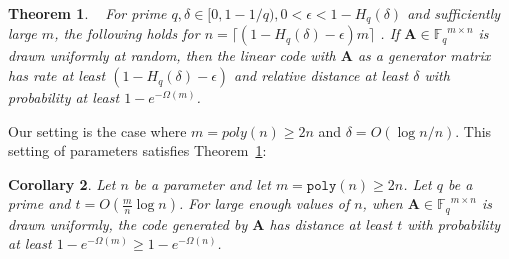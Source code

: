 \documentclass[11pt]{article}
\newcommand{\thref}[1]{\mbox{Theorem~\ref{#1}}}
\newcommand{\vect}[1]{\ensuremath{\textbf{#1}}}
\newcommand{\Fq}{\ensuremath{\mathbb{F}_q}}
\newcommand{\poly}{\ensuremath{\mathtt{poly}}\xspace}
\newtheorem{theorem}{Theorem}[section]
\newtheorem{corollary}[theorem]{Corollary}
\newcommand{\vA}{\vect{A}}
\begin{document}
\begin{theorem}~\cite[Theorem 8]{venkatLecture}
\label{thm:random code good distance}
For prime $q, \delta\in [0, 1-1/q), 0<\epsilon< 1-H_q(\delta)$ and sufficiently large $m$, the following holds for $n = \lceil (1-H_q(\delta) - \epsilon)m\rceil$ .  If $\vA \in \Fq^{m\times n}$ is drawn uniformly at random, then the linear code with $\vA$ as a generator matrix has rate at least $(1-H_q(\delta) -\epsilon)$ and relative distance at least $\delta$ with probability at least $1-e^{-\Omega(m)}$.
\end{theorem}
Our setting is the case where $m = poly(n)\geq 2n$ and $\delta = O (\log n /n)$.  This setting of parameters satisfies \thref{thm:random code good distance}:
\begin{corollary}
\label{cor:code high distance}
Let $n$ be a parameter and let $m = \poly(n)\geq 2n$.  
Let $q$ be a prime and $t = O(\frac{m}{n}\log n )$.  For large enough values of $n$, when $\vA\in \Fq^{m\times n}$ is drawn uniformly, the code generated by $\vA$ has distance at least $t$ with probability at least $1-e^{-\Omega(m)}\geq 1-e^{-\Omega(n)}$.
\end{corollary}
\end{document}
